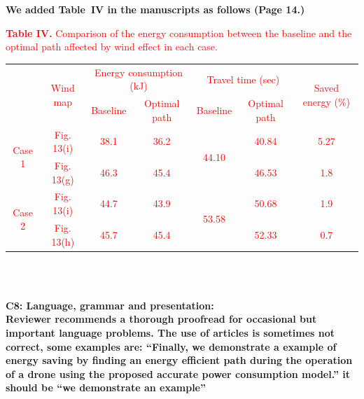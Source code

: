 \documentclass[onecolumn]{IEEEconf}
\begin{document}
\begin{description}
{	}
	~\\
	~\\
	\textbf{We added Table~IV in the manuscripts as follows (Page 14.)}\\
    \begin{mdframed}[ linewidth=.75pt, userdefinedwidth=0.9\textwidth]
    \textcolor{red}{\textbf{Table IV.} Comparison of the energy consumption between the baseline and the optimal path affected by wind effect in each case.}   
    \centering
    \label{tab: opt.result}
    \textcolor{red}{
    \begin{tabular}{|c|c|c|c|c|c|c|}
    \hline
    \multirow{2}{*}{} & \multirow{2}{*}{Wind map} & \multicolumn{2}{c|}{Energy consumption (kJ)} & \multicolumn{2}{c|}{Travel time (sec)} & \multirow{2}{*}{Saved energy (\%)} \\ \cline{3-6}
                        &            & Baseline & Optimal path & Baseline               & Optimal path &      \\ \hline
    \multirow{2}{*}{Case 1} & Fig. 13(i) & 38.1     & 36.2         & \multirow{2}{*}{44.10} & 40.84        & 5.27 \\ \cline{2-4} \cline{6-7} 
                        & Fig. 13(g) & 46.3     & 45.4         &                        & 46.53        & 1.8  \\ \hline
    \multirow{2}{*}{Case 2} & Fig. 13(i) & 44.7     & 43.9         & \multirow{2}{*}{53.58} & 50.68        & 1.9  \\ \cline{2-4} \cline{6-7} 
                        & Fig. 13(h) & 45.7     & 45.4         &                        & 52.33        & 0.7  \\ \hline
    \end{tabular}%
    }
    \end{mdframed}
    ~\\
    ~\\
    \item \textbf
    {
	C8: Language, grammar and presentation: \\
	Reviewer recommends a thorough proofread for occasional but important language problems.
	The use of articles is sometimes not correct, some examples are: ``Finally, we demonstrate a example of energy saving by finding an energy efficient path during the operation of a drone using the proposed accurate power consumption model.'' it should be ``we demonstrate an example''
}
\end{description}
\end{document}
